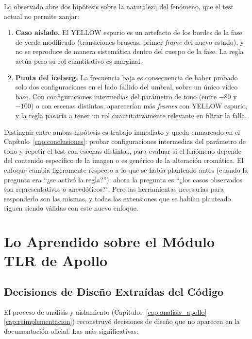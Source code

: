Lo observado abre dos hipótesis sobre la naturaleza del fenómeno, que el test actual no permite zanjar:

\begin{enumerate}
    \item \textbf{Caso aislado.} El YELLOW espurio es un artefacto de los bordes de la fase de verde modificado (transiciones bruscas, primer \textit{frame} del nuevo estado), y no se reproduce de manera sistemática dentro del cuerpo de la fase. La regla actúa pero su rol cuantitativo es marginal.

    \item \textbf{Punta del iceberg.} La frecuencia baja es consecuencia de haber probado solo dos configuraciones en el lado fallido del umbral, sobre un único video base. Con configuraciones intermedias del parámetro de tono (entre $-80$ y $-100$) o con escenas distintas, aparecerían más \textit{frames} con YELLOW espurio, y la regla pasaría a tener un rol cuantitativamente relevante en filtrar la falla.
\end{enumerate}

Distinguir entre ambas hipótesis es trabajo inmediato y queda enmarcado en el Capítulo~\ref{cap:conclusiones}: probar configuraciones intermedias del parámetro de tono y repetir el test con escenas distintas, para evaluar si el fenómeno depende del contenido específico de la imagen o es genérico de la alteración cromática. El enfoque cambia ligeramente respecto a lo que se había planteado antes (cuando la pregunta era ``¿se activó la regla?''): ahora la pregunta es ``¿los casos observados son representativos o anecdóticos?''. Pero las herramientas necesarias para responderlo son las mismas, y todas las extensiones que se habían planteado siguen siendo válidas con este nuevo enfoque.

\section{Lo Aprendido sobre el Módulo TLR de Apollo}

\subsection{Decisiones de Diseño Extraídas del Código}

El proceso de análisis y aislamiento (Capítulos~\ref{cap:analisis_apollo}--\ref{cap:reimplementacion}) reconstruyó decisiones de diseño que no aparecen en la documentación oficial. Las más significativas:

